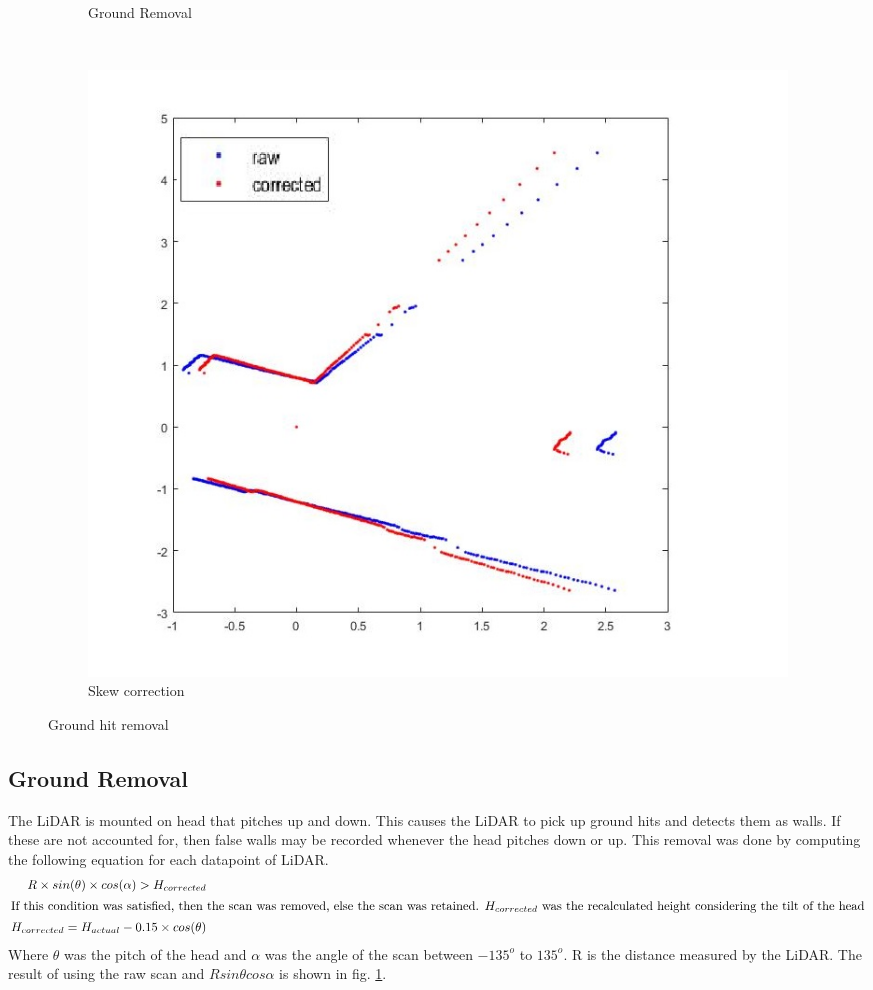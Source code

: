 \documentclass[fleqn,10pt]{SelfArx} %
\begin{document}
\begin{figure}
\begin{subfigure}[t]{0.3\textwidth}
        \caption{Ground Removal}
    \end{subfigure}
    ~
    \begin{subfigure}[t]{0.3\textwidth}
        \centering
        \includegraphics[scale = 0.3]{skew.jpg}
        \caption{Skew correction}
    \end{subfigure}
    \caption{Ground hit removal}
    \label{fig:gr}
\end{figure}

\subsection{Ground Removal}
\label{subsec:ground}
The LiDAR is mounted on head that pitches up and down. This causes the LiDAR to pick up ground hits and detects them as walls. If these are not accounted for, then false walls may be recorded whenever the head pitches down or up. This removal was done by computing the following equation for each datapoint of LiDAR.
\begin{align*}
R \times sin(\theta) \times cos(\alpha) > H_{corrected} \\
\intertext{If this condition was satisfied, then the scan was removed, else the scan was retained. $H_{corrected}$ was the recalculated height considering the tilt of the head}
H_{corrected} = H_{actual} - 0.15 \times cos(\theta) \\
\end{align*}
Where $\theta$ was the pitch of the head and $\alpha$ was the angle of the scan between $-135^o$ to $135^o$. R is the distance measured by the LiDAR. The result of using the raw scan and $Rsin\theta cos\alpha$ is shown in fig. \ref{fig:gr}.
\end{document}
